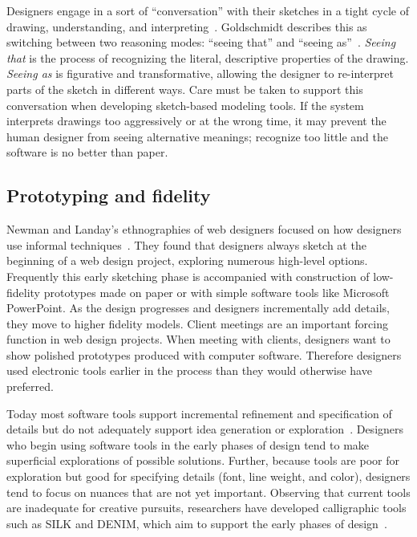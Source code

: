 Designers engage in a sort of ``conversation'' with their sketches in
a tight cycle of drawing, understanding, and
interpreting~\cite{schon-kinds-of-seeing}. Goldschmidt describes this
as switching between two reasoning modes: ``seeing that'' and ``seeing
as''~\cite{goldschmidt-dialectics}. \textit{Seeing that} is the
process of recognizing the literal, descriptive properties of the
drawing. \textit{Seeing as} is figurative and transformative, allowing
the designer to re-interpret parts of the sketch in different
ways. Care must be taken to support this conversation when developing
sketch-based modeling tools. If the system interprets drawings too
aggressively or at the wrong time, it may prevent the human designer
from seeing alternative meanings; recognize too little and the
software is no better than paper.

\subsection{Prototyping and fidelity}
\label{sec:traditional-prototyping}

Newman and Landay's ethnographies of web designers focused on how
designers use informal techniques~\cite{newman-web-designers}. They
found that designers always sketch at the beginning of a web design
project, exploring numerous high-level options. Frequently this early
sketching phase is accompanied with construction of low-fidelity
prototypes made on paper or with simple software tools like Microsoft
PowerPoint. As the design progresses and designers incrementally add
details, they move to higher fidelity models. Client meetings are an
important forcing function in web design projects. When meeting with
clients, designers want to show polished prototypes produced with
computer software. Therefore designers used electronic tools earlier
in the process than they would otherwise have preferred.

Today most software tools support incremental refinement and
specification of details but do not adequately support idea generation
or exploration~\cite{terry-creative-ui}. Designers who begin using
software tools in the early phases of design tend to make superficial
explorations of possible solutions. Further, because tools are poor
for exploration but good for specifying details (font, line weight,
and color), designers tend to focus on nuances that are not yet
important. Observing that current tools are inadequate for creative
pursuits, researchers have developed calligraphic tools such as SILK
and DENIM, which aim to support the early phases of
design~\cite{landay-silk,lin-denim}.

